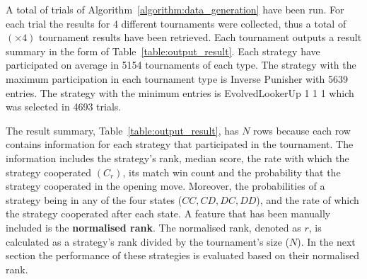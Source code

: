 \documentclass{article}
\newcommand{\uniquenumberofseeds}{}
\newcommand{\numberofalltournaments}{}
\begin{document}
A total of \uniquenumberofseeds trials of Algorithm~\ref{algorithm:data_generation} have been
run. For each trial the results for 4 different tournaments were collected,
thus a total of \numberofalltournaments $(\uniquenumberofseeds \times 4)$ tournament results have been
retrieved. Each tournament outputs a result summary in the form of
Table~\ref{table:output_result}. Each strategy have participated on average in
5154 tournaments of each type. The strategy with the maximum participation in each
tournament type is Inverse Punisher with 5639 entries. The strategy with the
minimum entries is EvolvedLookerUp 1 1 1 which was selected in 4693 trials.

The result summary, Table~\ref{table:output_result}, has \(N\) rows
because each row contains information for each strategy that participated in the
tournament. The information includes the strategy's rank, median score, the rate
with which the strategy cooperated $(C_r)$, its match win count and the
probability that the strategy cooperated in the opening move. Moreover, the
probabilities of a strategy being in any of the four states ($CC, CD, DC, DD$),
and the rate of which the strategy cooperated after each state. A feature that
has been manually included is the \textbf{normalised rank}. The normalised rank,
denoted as $r$, is calculated as a strategy's rank divided by the tournament's
size ($N$). In the next section the performance of these strategies is evaluated
based on their normalised rank.
\end{document}
